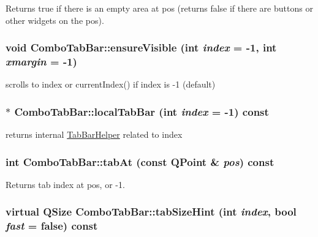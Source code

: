 Returns true if there is an empty area at pos (returns false if there are buttons or other widgets on the pos). 

\hypertarget{class_combo_tab_bar_a67abbf211f68ffe53c10654311a95621}{
\subsubsection[{ensureVisible}]{\setlength{\rightskip}{0pt plus 5cm}void ComboTabBar::ensureVisible (int {\em index} = {\ttfamily -\/1}, \/  int {\em xmargin} = {\ttfamily -\/1})}}
\label{class_combo_tab_bar_a67abbf211f68ffe53c10654311a95621}


scrolls to index or currentIndex() if index is -\/1 (default) 

\hypertarget{class_combo_tab_bar_a262d76912a414546f74bb804de6abe9c}{
\subsubsection[{localTabBar}]{$\ast$ ComboTabBar::localTabBar (int {\em index} = {\ttfamily -\/1}) const}}
\label{class_combo_tab_bar_a262d76912a414546f74bb804de6abe9c}


returns internal \hyperlink{class_tab_bar_helper}{TabBarHelper} related to index 

\hypertarget{class_combo_tab_bar_a2ba10737ac0dd8848f97434a9c5814f3}{
\subsubsection[{tabAt}]{\setlength{\rightskip}{0pt plus 5cm}int ComboTabBar::tabAt (const QPoint \& {\em pos}) const}}
\label{class_combo_tab_bar_a2ba10737ac0dd8848f97434a9c5814f3}


Returns tab index at pos, or -\/1. 

\hypertarget{class_combo_tab_bar_aedd5c86124231d4d5df2bbc297edf046}{
\subsubsection[{tabSizeHint}]{\setlength{\rightskip}{0pt plus 5cm}virtual QSize ComboTabBar::tabSizeHint (int {\em index}, \/  bool {\em fast} = {\ttfamily false}) const}}
\label{class_combo_tab_bar_aedd5c86124231d4d5df2bbc297edf046}


